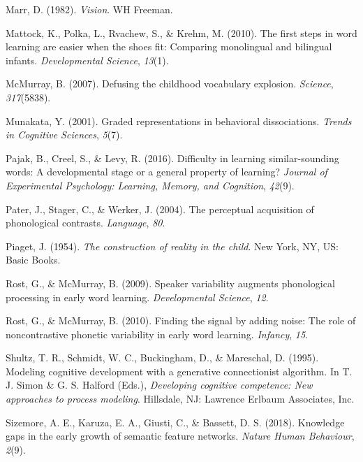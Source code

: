 \documentclass[english,,man]{apa6}
\begin{document}
\leavevmode\hypertarget{ref-marr1982}{}%
Marr, D. (1982). \emph{Vision}. WH Freeman.

\leavevmode\hypertarget{ref-Mattock2010}{}%
Mattock, K., Polka, L., Rvachew, S., \& Krehm, M. (2010). The first steps in word learning are easier when the shoes fit: Comparing monolingual and bilingual infants. \emph{Developmental Science}, \emph{13}(1).

\leavevmode\hypertarget{ref-McMurray2007}{}%
McMurray, B. (2007). Defusing the childhood vocabulary explosion. \emph{Science}, \emph{317}(5838).

\leavevmode\hypertarget{ref-Munakata2001}{}%
Munakata, Y. (2001). Graded representations in behavioral dissociations. \emph{Trends in Cognitive Sciences}, \emph{5}(7).

\leavevmode\hypertarget{ref-pajak2016}{}%
Pajak, B., Creel, S., \& Levy, R. (2016). Difficulty in learning similar-sounding words: A developmental stage or a general property of learning? \emph{Journal of Experimental Psychology: Learning, Memory, and Cognition}, \emph{42}(9).

\leavevmode\hypertarget{ref-pater2004}{}%
Pater, J., Stager, C., \& Werker, J. (2004). The perceptual acquisition of phonological contrasts. \emph{Language}, \emph{80}.

\leavevmode\hypertarget{ref-piaget1954}{}%
Piaget, J. (1954). \emph{The construction of reality in the child}. New York, NY, US: Basic Books.

\leavevmode\hypertarget{ref-rost2009}{}%
Rost, G., \& McMurray, B. (2009). Speaker variability augments phonological processing in early word learning. \emph{Developmental Science}, \emph{12}.

\leavevmode\hypertarget{ref-rost2010}{}%
Rost, G., \& McMurray, B. (2010). Finding the signal by adding noise: The role of noncontrastive phonetic variability in early word learning. \emph{Infancy}, \emph{15}.

\leavevmode\hypertarget{ref-shultz1995}{}%
Shultz, T. R., Schmidt, W. C., Buckingham, D., \& Mareschal, D. (1995). Modeling cognitive development with a generative connectionist algorithm. In T. J. Simon \& G. S. Halford (Eds.), \emph{Developing cognitive competence: New approaches to process modeling}. Hillsdale, NJ: Lawrence Erlbaum Associates, Inc.

\leavevmode\hypertarget{ref-sizemore2018}{}%
Sizemore, A. E., Karuza, E. A., Giusti, C., \& Bassett, D. S. (2018). Knowledge gaps in the early growth of semantic feature networks. \emph{Nature Human Behaviour}, \emph{2}(9).
\end{document}
